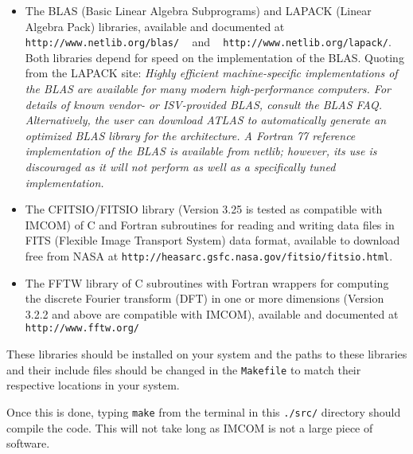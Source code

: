 \documentclass[10pt]{article}
\begin{document}
\begin{itemize}
\item The BLAS (Basic Linear Algebra Subprograms) and LAPACK (Linear Algebra Pack) libraries, available and documented at 
\newline
\texttt{http://www.netlib.org/blas/} ~ and ~ \newline
 \texttt{http://www.netlib.org/lapack/}.  
\newline
Both libraries depend for speed on the implementation of the BLAS.  Quoting from the LAPACK site: \emph{Highly efficient machine-specific implementations of the BLAS are available for many modern high-performance computers. For details of known vendor- or ISV-provided BLAS, consult the BLAS FAQ. Alternatively, the user can download ATLAS to automatically generate an optimized BLAS library for the architecture. A Fortran 77 reference implementation of the BLAS is available from netlib; however, its use is discouraged as it will not perform as well as a specifically tuned implementation.}

\item The CFITSIO/FITSIO library (Version 3.25 is tested as compatible with IMCOM) of C and Fortran subroutines for reading and writing data files in FITS (Flexible Image Transport System) data format, available to download free from NASA at \newline \texttt{http://heasarc.gsfc.nasa.gov/fitsio/fitsio.html}.

\item The FFTW library of C subroutines with Fortran wrappers for computing the discrete Fourier transform (DFT) in one or more dimensions (Version 3.2.2 and above are compatible with IMCOM), available and documented at \newline
\texttt{http://www.fftw.org/}
\end{itemize}

These libraries should be installed on your system and the paths to these libraries and their include files should be changed in the \texttt{Makefile} to match their respective locations in your system.  

Once this is done, typing \texttt{make} from the terminal in this \texttt{./src/} directory should compile the code.  This will not take long as IMCOM is not a large piece of software.
\end{document}
